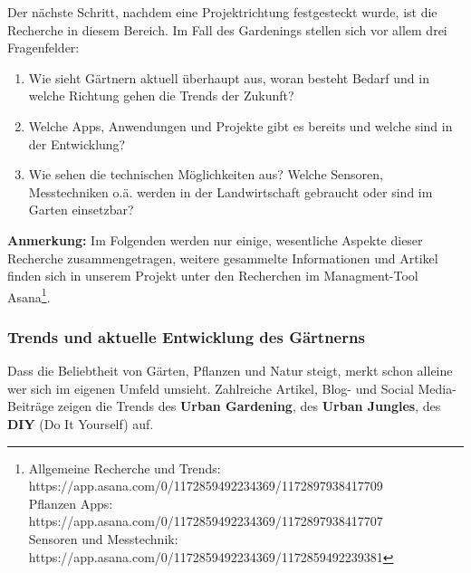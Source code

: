 Der nächste Schritt, nachdem eine Projektrichtung festgesteckt wurde,
ist die Recherche in diesem Bereich. Im Fall des Gardenings stellen sich
vor allem drei Fragenfelder:

\begin{enumerate}
\def\labelenumi{\arabic{enumi}.}
\tightlist
\item
  Wie sieht Gärtnern aktuell überhaupt aus, woran besteht Bedarf und in
  welche Richtung gehen die Trends der Zukunft?
\item
  Welche Apps, Anwendungen und Projekte gibt es bereits und welche sind
  in der Entwicklung?
\item
  Wie sehen die technischen Möglichkeiten aus? Welche Sensoren,
  Messtechniken o.ä. werden in der Landwirtschaft gebraucht oder sind im
  Garten einsetzbar?
\end{enumerate}

\textbf{Anmerkung:} Im Folgenden werden nur einige, wesentliche Aspekte
dieser Recherche zusammengetragen, weitere gesammelte Informationen und
Artikel finden sich in unserem Projekt unter den Recherchen im
Managment-Tool Asana\footnote{Allgemeine Recherche und Trends:
  https://app.asana.com/0/1172859492234369/1172897938417709\\
  Pflanzen Apps:
  https://app.asana.com/0/1172859492234369/1172897938417707\\
  Sensoren und Messtechnik:
  https://app.asana.com/0/1172859492234369/1172859492239381}.

\hypertarget{trends-und-aktuelle-entwicklung-des-guxe4rtnerns}{%
\subsubsection{Trends und aktuelle Entwicklung des
Gärtnerns}\label{trends-und-aktuelle-entwicklung-des-guxe4rtnerns}}

Dass die Beliebtheit von Gärten, Pflanzen und Natur steigt, merkt schon
alleine wer sich im eigenen Umfeld umsieht. Zahlreiche Artikel, Blog-
und Social Media-Beiträge zeigen die Trends des \textbf{Urban
Gardening}, des \textbf{Urban Jungles}, des \textbf{DIY} (Do It
Yourself) auf.

